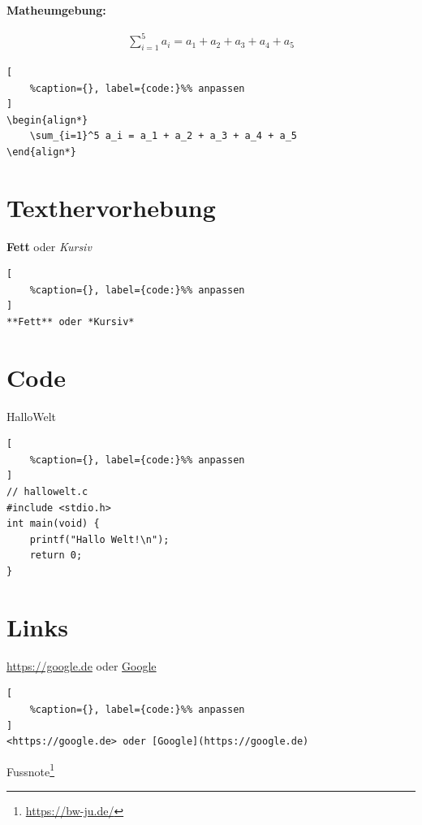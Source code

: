 \textbf{Matheumgebung:}

\begin{align*}
    \sum_{i=1}^5 a_i = a_1 + a_2 + a_3 + a_4 + a_5
\end{align*}

\lstset{language=C}%
\begin{lstlisting}[
	%caption={}, label={code:}%% anpassen
]
\begin{align*}
    \sum_{i=1}^5 a_i = a_1 + a_2 + a_3 + a_4 + a_5
\end{align*}
\end{lstlisting}

\section{Texthervorhebung}\label{texthervorhebung}

\textbf{Fett} oder \emph{Kursiv}

\lstset{language=C}%
\begin{lstlisting}[
	%caption={}, label={code:}%% anpassen
]
**Fett** oder *Kursiv*
\end{lstlisting}

\section{Code}\label{code}

HalloWelt %

\lstset{language=C}%
\begin{lstlisting}[
	%caption={}, label={code:}%% anpassen
]
// hallowelt.c
#include <stdio.h>
int main(void) {
    printf("Hallo Welt!\n");
    return 0;
}
\end{lstlisting}

\section{Links}\label{links}

\url{https://google.de} oder \href{https://google.de}{Google}

\lstset{language=C}%
\begin{lstlisting}[
	%caption={}, label={code:}%% anpassen
]
<https://google.de> oder [Google](https://google.de)
\end{lstlisting}

Fussnote\footnote{\url{https://bw-ju.de/}}

